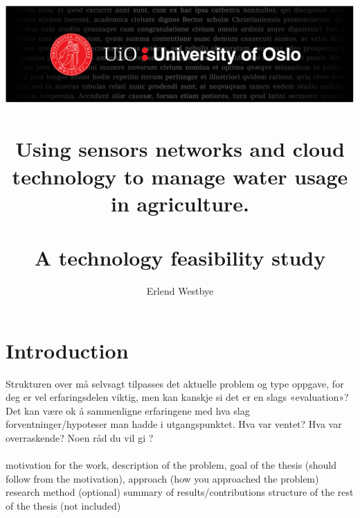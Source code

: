 \documentclass[]{uiophd}
\begin{document}
\title{\includegraphics[scale=0.5]{toppfelt-english.jpg}\\\\
Using sensors networks and cloud technology to manage water usage in agriculture.
\\\\
\large A technology feasibility study}
\author{Erlend Westbye}


\frontmatter
\maketitle
\tableofcontents
\linespread{1.3}



\mainmatter

\chapter{Introduction}
Strukturen over må selvsagt tilpasses det aktuelle problem og type oppgave, for deg er vel erfaringsdelen viktig, men kan kanskje si det er en slags «evaluation»?
Det kan være ok å sammenligne erfaringene med hva slag forventninger/hypoteser man hadde i utgangspunktet.
Hva var ventet? Hva var overraskende? Noen råd du vil gi ?
\\\\
motivation for the work, description of the problem, 
goal of the thesis (should follow from the motivation), 
approach (how you approached the problem)
research method (optional)
summary of results/contributions
structure of the rest of the thesis (not included)
\end{document}
